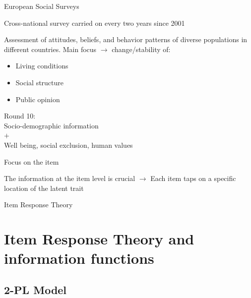 \documentclass{beamer} %
\begin{document}
\begin{frame}{European Social Surveys}

Cross-national survey carried on every two years since 2001 

\vspace{1.5mm}

Assessment of attitudes, beliefs, and behavior patterns of diverse populations in different countries. Main focus $\rightarrow$ change/stability of:
 
\begin{itemize}
\item Living conditions
\item Social structure 
\item Public opinion	
\end{itemize}

\vspace{1.8mm}
\begin{center}
	Round 10:  \\\vspace{1.5mm} Socio-demographic information \\\vspace{1.5mm} $+$ \\\vspace{1.5mm}  Well being, social exclusion, human values
\end{center}







\end{frame}

\begin{frame}{Focus on the item}

The information at the item level is crucial $\rightarrow$ Each item taps on  a specific location of the latent trait 

\begin{center}
Item Response Theory 
\end{center}
\end{frame}


\section[IRT and Information Functions]{Item Response Theory and information functions}

\subsection*{2-PL Model}
\end{document}
